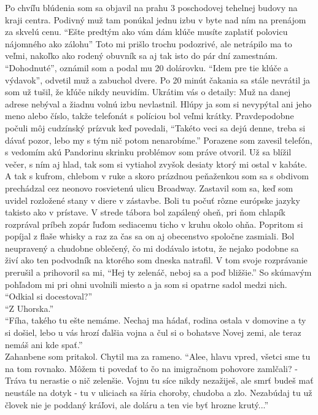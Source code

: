 \documentclass[12pt, a4paper]{article}
\begin{document}
Po chvíľu blúdenia som sa objavil na prahu 3 poschodovej tehelnej budovy na kraji centra.
Podivný muž tam ponúkal jednu izbu v byte nad ním na prenájom za skvelú cenu.
\enquote{Ešte predtým ako vám dám klúče musíte zaplatiť polovicu nájomného ako zálohu}
Toto mi prišlo trochu podozrivé, ale netrápilo ma to veľmi, nakoľko ako rodený obuvník sa aj tak isto do pár dní zamestnám.
\enquote{Dohodnuté}, oznámil som a podal mu 20 dolárovku.
\enquote{Idem pre tie klúče a výdavok}, odvetil muž a zabuchol dvere.
Po 20 minút čakania sa stále nevrátil ja som už tušil, že kľúče nikdy neuvidím. Ukrátim vás o detaily: Muž na danej adrese nebýval a žiadnu volnú izbu nevlastnil.
Hlúpy ja som si nevypýtal ani jeho meno alebo číslo, takže telefonát s políciou bol veľmi krátky. Pravdepodobne počuli môj cudzínský prízvuk keď povedali, \enquote{Takéto veci sa dejú denne, treba si dávať pozor, lebo my s tým nič potom nenarobíme.}
Porazene som zavesil telefón, s vedomím akú Pandorinu skrinku problémov som práve otvoril.
Už sa blížil večer, s ním aj hlad, tak som si vytiahol zvyšok desiaty ktorý mi ostal v kabáte.
A tak s kufrom, chlebom v ruke a skoro prázdnou peňaženkou som sa s obdivom prechádzal cez neonovo rosvietenú ulicu Broadway.
Zastavil som sa, keď som uvidel rozložené stany v diere v zástavbe.
Boli tu počuť rôzne európske jazyky takisto ako v prístave.
V strede tábora bol zapálený oheň, pri ňom chlapík rozprával príbeh zopár ľuďom sediacemu ticho v kruhu okolo ohňa.
Popritom si popíjal z flaše whisky a raz za čas sa on aj obecenstvo spoločne zasmiali.
Bol neupravený a chudobne oblečený, čo mi dodávalo istotu, že nejako podobne sa živí ako ten podvodník na ktorého som dneska natrafil.
V tom svoje rozprávanie prerušil a prihovoril sa mi, \enquote{Hej ty zelenáč, neboj sa a poď bližšie.} So skúmavým pohľadom mi pri ohni uvolnili miesto a ja som si opatrne sadol medzi nich.
\\\enquote{Odkial si docestoval?}
\\\enquote{Z Uhorska.}
\\\enquote{Fíha, takého tu ešte nemáme.
Nechaj ma hádať, rodina ostala v domovine a ty si došiel, lebo u vás hrozí ďalšia vojna a čul si o bohatsve Novej zemi, ale teraz nemáš ani kde spať.}
\\Zahanbene som pritakol.
Chytil ma za rameno. \enquote{Alee, hlavu vpred, všetci sme tu na tom rovnako. Môžem ti povedať to čo na imigračnom pohovore zamlčali? - Tráva tu nerastie o nič zelenšie. Vojnu tu síce nikdy nezažiješ, ale smrť budeš mať neustále na dotyk - tu v uliciach sa šíria choroby, chudoba a zlo. Nezabúdaj tu už človek nie je poddaný kráľovi, ale doláru a ten vie byť hrozne krutý...}
\end{document}

